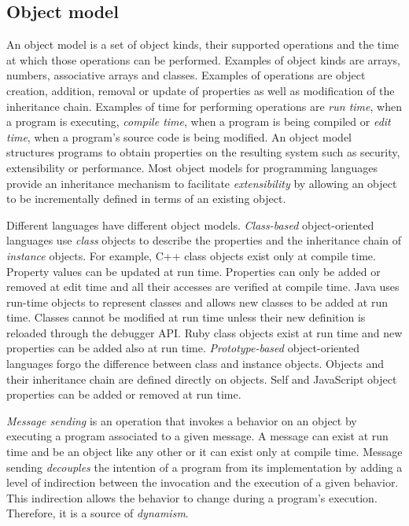 \subsection{Object model}

An object model is a set of object kinds, their supported operations and the
time at which those operations can be performed.  Examples of object kinds are
arrays, numbers, associative arrays and classes.  Examples of operations are
object creation, addition, removal or update of properties as well as
modification of the inheritance chain. Examples of time for performing
operations are \textit{run time}, when a program is executing, \textit{compile
time}, when a program is being compiled or \textit{edit time}, when a program's
source code is being modified. An object model structures programs to obtain
properties on the resulting system such as security, extensibility or
performance. Most object models for programming languages provide an
inheritance mechanism to facilitate \textit{extensibility} by allowing an object
to be incrementally defined in terms of an existing object.

Different languages have different object models. \textit{Class-based}
object-oriented languages use \textit{class} objects to describe the properties
and the inheritance chain of \textit{instance} objects. For example, C++ class
objects exist only at compile time. Property values can be updated at run time.
Properties can only be added or removed at edit time and all their accesses are
verified at compile time. Java uses run-time objects to represent classes and
allows new classes to be added at run time.  Classes cannot be modified at run
time unless their new definition is reloaded through the debugger API. Ruby
class objects exist at run time and new properties can be added also at run
time. \textit{Prototype-based} object-oriented languages forgo the difference
between class and instance objects. Objects and their inheritance chain are
defined directly on objects. Self and JavaScript object properties can be
added or removed at run time. 

\textit{Message sending} is an operation that invokes a behavior on an object by
executing a program associated to a given message.  A message can exist at run
time and be an object like any other or it can exist only at compile time.
Message sending \textit{decouples} the intention of a program from its
implementation by adding a level of indirection between the invocation and the
execution of a given behavior. This indirection allows the behavior to change
during a program's execution. Therefore, it is a source of \textit{dynamism}.

